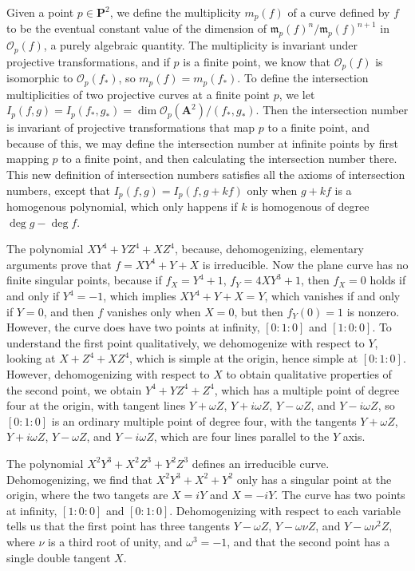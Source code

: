 Given a point $p \in \mathbf{P}^2$, we define the multiplicity $m_p(f)$ of a curve defined by $f$ to be the eventual constant value of the dimension of $\mathfrak{m}_p(f)^n/\mathfrak{m}_p(f)^{n+1}$ in $\mathcal{O}_p(f)$, a purely algebraic quantity. The multiplicity is invariant under projective transformations, and if $p$ is a finite point, we know that $\mathcal{O}_p(f)$ is isomorphic to $\mathcal{O}_p(f_*)$, so $m_p(f) = m_p(f_*)$. To define the intersection multiplicities of two projective curves at a finite point $p$, we let $I_p(f,g) = I_p(f_*,g_*) = \dim \mathcal{O}_p(\mathbf{A}^2)/(f_*,g_*)$. Then the intersection number is invariant of projective transformations that map $p$ to a finite point, and because of this, we may define the intersection number at infinite points by first mapping $p$ to a finite point, and then calculating the intersection number there. This new definition of intersection numbers satisfies all the axioms of intersection numbers, except that $I_p(f,g) = I_p(f,g + kf)$ only when $g + kf$ is a homogenous polynomial, which only happens if $k$ is homogenous of degree $\deg g - \deg f$.

\begin{example}
    The polynomial $XY^4 + YZ^4 + XZ^4$, because, dehomogenizing, elementary arguments prove that $f = XY^4 + Y + X$ is irreducible. Now the plane curve has no finite singular points, because if $f_X = Y^4 + 1$, $f_Y = 4XY^3 + 1$, then $f_X = 0$ holds if and only if $Y^4 = -1$, which implies $XY^4 + Y + X = Y$, which vanishes if and only if $Y = 0$, and then $f$ vanishes only when $X = 0$, but then $f_Y(0) = 1$ is nonzero. However, the curve does have two points at infinity, $[0:1:0]$ and $[1:0:0]$. To understand the first point qualitatively, we dehomogenize with respect to $Y$, looking at $X + Z^4 + XZ^4$, which is simple at the origin, hence simple at $[0:1:0]$. However, dehomogenizing with respect to $X$ to obtain qualitative properties of the second point, we obtain $Y^4 + YZ^4 + Z^4$, which has a multiple point of degree four at the origin, with tangent lines $Y + \omega Z$, $Y + i \omega Z$, $Y - \omega Z$, and $Y - i \omega Z$, so $[0:1:0]$ is an ordinary multiple point of degree four, with the tangents $Y + \omega Z$, $Y + i \omega Z$, $Y - \omega Z$, and $Y - i \omega Z$, which are four lines parallel to the $Y$ axis.
\end{example}

\begin{example}
    The polynomial $X^2Y^3 + X^2Z^3 + Y^2Z^3$ defines an irreducible curve. Dehomogenizing, we find that $X^2Y^3 + X^2 + Y^2$ only has a singular point at the origin, where the two tangets are $X = iY$ and $X = -iY$. The curve has two points at infinity, $[1:0:0]$ and $[0:1:0]$. Dehomogenizing with respect to each variable tells us that the first point has three tangents $Y - \omega Z$, $Y - \omega \nu Z$, and $Y - \omega \nu^2 Z$, where $\nu$ is a third root of unity, and $\omega^3 = -1$, and that the second point has a single double tangent $X$.
\end{example}

